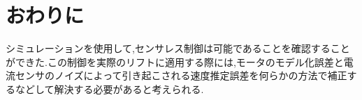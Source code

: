 \chapter{おわりに}シミュレーションを使用して,センサレス制御は可能であることを確認することができた.この制御を実際のリフトに適用する際には,モータのモデル化誤差と電流センサのノイズによって引き起こされる速度推定誤差を何らかの方法で補正するなどして解決する必要があると考えられる.